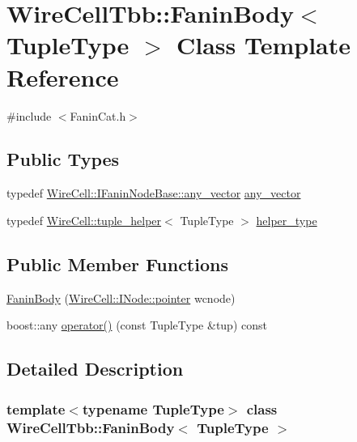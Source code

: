 \hypertarget{class_wire_cell_tbb_1_1_fanin_body}{}\section{Wire\+Cell\+Tbb\+:\+:Fanin\+Body$<$ Tuple\+Type $>$ Class Template Reference}
\label{class_wire_cell_tbb_1_1_fanin_body}


{\ttfamily \#include $<$Fanin\+Cat.\+h$>$}

\subsection*{Public Types}
\begin{DoxyCompactItemize}
\item 
typedef \hyperlink{class_wire_cell_1_1_i_fanin_node_base_a9dc315fe5b56f41f13ea247fc4b7f34b}{Wire\+Cell\+::\+I\+Fanin\+Node\+Base\+::any\+\_\+vector} \hyperlink{class_wire_cell_tbb_1_1_fanin_body_a774a17ab7c2acdd100a45b298ae1369e}{any\+\_\+vector}
\item 
typedef \hyperlink{struct_wire_cell_1_1tuple__helper}{Wire\+Cell\+::tuple\+\_\+helper}$<$ Tuple\+Type $>$ \hyperlink{class_wire_cell_tbb_1_1_fanin_body_aeb3e184395d2e4952aca2dd883f502c1}{helper\+\_\+type}
\end{DoxyCompactItemize}
\subsection*{Public Member Functions}
\begin{DoxyCompactItemize}
\item 
\hyperlink{class_wire_cell_tbb_1_1_fanin_body_aee5c583d48127db0d04b41bedafa5b87}{Fanin\+Body} (\hyperlink{class_wire_cell_1_1_interface_a09c548fb8266cfa39afb2e74a4615c37}{Wire\+Cell\+::\+I\+Node\+::pointer} wcnode)
\item 
boost\+::any \hyperlink{class_wire_cell_tbb_1_1_fanin_body_a3f3dea7753a753932a569271f1a0589c}{operator()} (const Tuple\+Type \&tup) const
\end{DoxyCompactItemize}


\subsection{Detailed Description}
\subsubsection*{template$<$typename Tuple\+Type$>$\newline
class Wire\+Cell\+Tbb\+::\+Fanin\+Body$<$ Tuple\+Type $>$}



